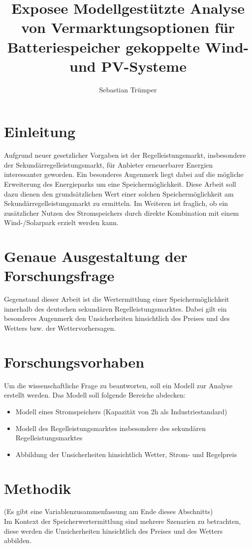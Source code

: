 \documentclass[british,         %
BCOR=2mm,                       %
11pt,                           %
a4paper,						%
oneside,						%
cdgeometry,                     %
toc=chapterentrydotfill,        %
toc=indent,                     %
bibliography=totoc,         	%
listof=totoc,                   %
numbers=noenddot,				%
parskip=full,                   %
cdmath=false					%
]{article}                  %
\title{Exposee Modellgestützte Analyse von Vermarktungsoptionen für Batteriespeicher gekoppelte Wind- und PV-Systeme}
\author{Sebastian Trümper}
\date{ }vcvcdfffc
\begin{document}

\maketitle

\tableofcontents


\section{Einleitung}
Aufgrund neuer gesetzlicher Vorgaben ist der Regelleistungsmarkt, 
insbesondere der Sekundärregelleistungsmarkt, 
für Anbieter erneuerbarer Energien interessanter geworden. Ein besonderes Augenmerk liegt dabei auf die mögliche Erweiterung des Energieparks 
um eine Speichermöglichkeit. Diese Arbeit soll dazu dienen den grundsätzlichen Wert einer solchen Speichermöglichkeit
am Sekundärregelleistungsmarkt zu ermitteln.
Im Weiteren ist fraglich, ob ein zusätzlicher Nutzen des Stromspeichers durch direkte Kombination mit einem 
Wind-/Solarpark erzielt werden kann.


\section{Genaue Ausgestaltung der Forschungsfrage}
Gegenstand dieser Arbeit ist die Wertermittlung einer Speichermöglichkeit innerhalb des deutschen sekundären Regelleistungsmarktes. 
Dabei gilt ein besonderes Augenmerk den Unsicherheiten hinsichtlich des Preises und des Wetters bzw. der Wettervorhersagen.


\section{Forschungsvorhaben}
Um die wissenschaftliche Frage zu beantworten, soll ein Modell zur Analyse erstellt werden. 
Das Modell soll folgende Bereiche abdecken: 
\begin{itemize}
	\item Modell eines Stromspeichers (Kapazität von 2h als Industriestandard)
	\item Modell des Regelleistungsmarktes insbesondere des sekundären Regelleistungsmarktes
	\item Abbildung der Unsicherheiten hinsichtlich Wetter, Strom- und Regelpreis
\end{itemize}



\section{Methodik}
 (Es gibt eine Variablenzusammenfassung am Ende dieses Abschnitts)\\
Im Kontext der Speicherwertermittlung sind mehrere Szenarien zu betrachten, 
diese werden die Unsicherheiten hinsichtlich des Preises und des Wetters abbilden.
\end{document}
